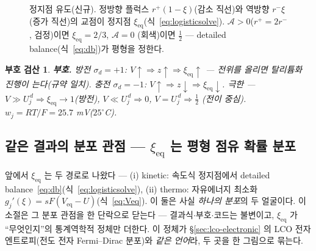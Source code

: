\documentclass[11pt,a4paper]{article}
\newtheorem*{signbox}{부호 검산}
\newcommand{\eq}{\mathrm{eq}}
\begin{document}
\begin{figure}[t]
\centering
{}
\caption{정지점 유도(신규). 정방향 플럭스 $r^+(1-\xi)$(감소 직선)와 역방향 $r^-\xi$(증가 직선)의 교점이 정지점
$\xi_\eq$(식~\eqref{eq:logisticsolve}). $\mathcal A>0$($r^+=2r^-$, 검정)이면 $\xi_\eq=2/3$, $\mathcal A=0$
(회색)이면 $\tfrac12$ — detailed balance(식~\eqref{eq:db})가 평형을 정한다.}
\label{fig:flux}
\end{figure}

\begin{signbox}
\textbf{부호.} 방전 $\sigma_d=+1$: $V\!\uparrow\Rightarrow z\!\uparrow\Rightarrow\xi_\eq\!\uparrow$ — 전위를 올리면
탈리튬화 진행이 는다(규약 일치). 충전 $\sigma_d=-1$: $V\!\uparrow\Rightarrow z\!\downarrow\Rightarrow\xi_\eq\!\downarrow$.
극한 — $V\gg U_j^{\,d}\Rightarrow\xi_\eq\to1$(방전), $V\ll U_j^{\,d}\Rightarrow0$, $V=U_j^{\,d}\Rightarrow\tfrac12$
(전이 중심). $w_j=RT/F=25.7$ mV($25^\circ$C).
\end{signbox}

\subsection{같은 결과의 분포 관점 — $\xi_\eq$ 는 평형 점유 확률 분포}\label{sec:dist}
앞에서 $\xi_\eq$ 는 두 경로로 나왔다 — (i) kinetic: 속도식 정지점에서 detailed balance~\eqref{eq:db}(식~\eqref{eq:logisticsolve}),
(ii) thermo: 자유에너지 최소화 $g_j'(\xi)=sF(V_\eq-U)$(식~\eqref{eq:Veq}). 이 둘은 사실 \emph{하나의 분포}의 두 얼굴이다.
이 소절은 그 분포 관점을 한 단락으로 닫는다 — 결과식$\cdot$부호$\cdot$코드는 불변이고, $\xi_\eq$ 가 ``무엇인지''의 통계역학적
정체만 더한다. 이 정체가 \S\ref{sec:lco-electronic} 의 LCO 전자 엔트로피(전도 전자 Fermi--Dirac 분포)와 \emph{같은
언어}라, 두 곳을 한 그림으로 묶는다.
\end{document}
